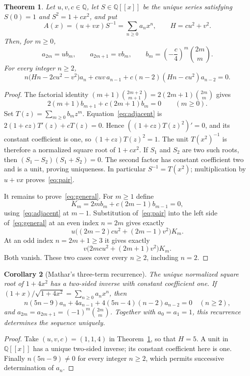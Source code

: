 \documentclass[11pt]{article}
\newtheorem{theorem}{Theorem}
\newtheorem{corollary}[theorem]{Corollary}
\newcommand{\Q}{\mathbb{Q}}
\begin{document}
\begin{theorem}\label{thm:family}
Let $u,v,c\in\Q$, let $S\in\Q[[x]]$ be the unique series satisfying
$S(0)=1$ and $S^2=1+cx^2$, and put
\[
 A(x)=(u+vx)S^{-1}=\sum_{n\geq0}a_nx^n,
 \qquad H=cu^2+v^2.
\]
Then, for $m\geq0$,
\begin{equation}\label{eq:pair}
 a_{2m}=u b_m,\qquad a_{2m+1}=v b_m,
 \qquad b_m=\left(-\frac c4\right)^m\binom{2m}{m}.
\end{equation}
For every integer $n\geq2$,
\begin{equation}\label{eq:general}
 n\bigl(Hn-2cu^2-v^2\bigr)a_n
 +cuv\,a_{n-1}
 +c(n-2)(Hn-cu^2)a_{n-2}=0.
\end{equation}
\end{theorem}

\begin{proof}
The factorial identity
$(m+1)\binom{2m+2}{m+1}=2(2m+1)\binom{2m}{m}$ gives
\begin{equation}\label{eq:adjacent}
 2(m+1)b_{m+1}+c(2m+1)b_m=0\qquad(m\geq0).
\end{equation}
Set $T(z)=\sum_{m\geq0}b_mz^m$. Equation~\eqref{eq:adjacent} is
$2(1+cz)T'(z)+cT(z)=0$. Hence
$((1+cz)T(z)^2)'=0$, and its constant coefficient is one, so
$(1+cz)T(z)^2=1$.
The unit $T(x^2)^{-1}$ is therefore a normalized square root of $1+cx^2$.
If $S_1$ and $S_2$ are two such roots, then
$(S_1-S_2)(S_1+S_2)=0$. The second factor has constant coefficient two
and is a unit, proving uniqueness. In particular $S^{-1}=T(x^2)$;
multiplication by $u+vx$ proves~\eqref{eq:pair}.

It remains to prove~\eqref{eq:general}. For $m\geq1$ define
\[
 K_m=2m b_m+c(2m-1)b_{m-1}=0,
\]
using~\eqref{eq:adjacent} at $m-1$.
Substitution of~\eqref{eq:pair} into the left side of~\eqref{eq:general}
at an even index $n=2m$ gives exactly
\[
 u\bigl((2m-2)cu^2+(2m-1)v^2\bigr)K_m.
\]
At an odd index $n=2m+1\geq3$ it gives exactly
\[
 v\bigl(2mcu^2+(2m+1)v^2\bigr)K_m.
\]
Both vanish. These two cases cover every $n\geq2$, including $n=2$.
\end{proof}

\begin{corollary}[Mathar's three-term recurrence]\label{cor:target}
The unique normalized square root of $1+4x^2$ has a two-sided inverse
with constant coefficient one. If
$(1+x)/\sqrt{1+4x^2}=\sum_{n\geq0}a_nx^n$, then
\begin{equation}\label{eq:target}
 n(5n-9)a_n+4a_{n-1}+4(5n-4)(n-2)a_{n-2}=0\quad(n\geq2),
\end{equation}
and $a_{2m}=a_{2m+1}=(-1)^m\binom{2m}{m}$.
Together with $a_0=a_1=1$, this recurrence determines the sequence uniquely.
\end{corollary}
\begin{proof}
Take $(u,v,c)=(1,1,4)$ in Theorem~\ref{thm:family}, so that $H=5$.
A unit in $\Q[[x]]$ has a unique two-sided inverse; its constant
coefficient here is one. Finally $n(5n-9)\ne0$ for every integer $n\geq2$,
which permits successive determination of $a_n$.
\end{proof}
\end{document}
